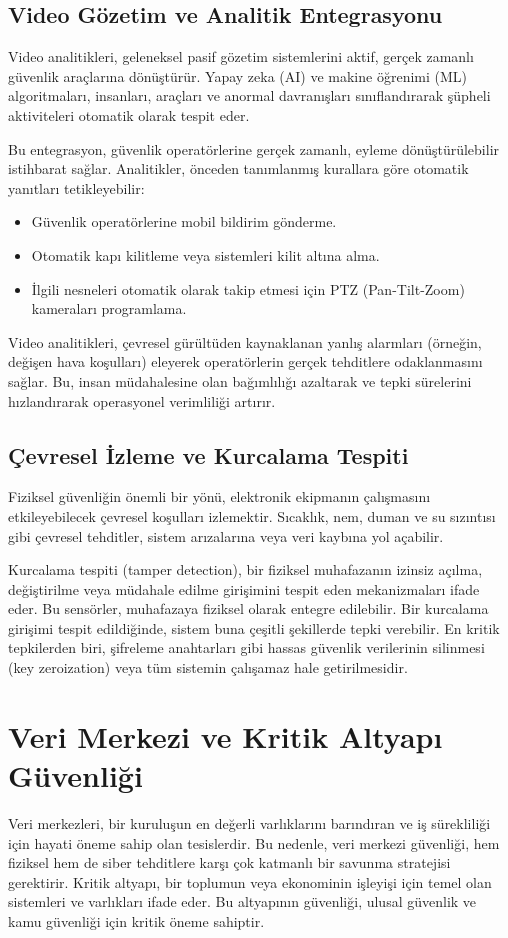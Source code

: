\subsection{Video Gözetim ve Analitik Entegrasyonu}

Video analitikleri, geleneksel pasif gözetim sistemlerini aktif, gerçek zamanlı güvenlik araçlarına dönüştürür. Yapay zeka (AI) ve makine öğrenimi (ML) algoritmaları, insanları, araçları ve anormal davranışları sınıflandırarak şüpheli aktiviteleri otomatik olarak tespit eder.

Bu entegrasyon, güvenlik operatörlerine gerçek zamanlı, eyleme dönüştürülebilir istihbarat sağlar. Analitikler, önceden tanımlanmış kurallara göre otomatik yanıtları tetikleyebilir:
\begin{itemize}
    \item Güvenlik operatörlerine mobil bildirim gönderme.
    \item Otomatik kapı kilitleme veya sistemleri kilit altına alma.
    \item İlgili nesneleri otomatik olarak takip etmesi için PTZ (Pan-Tilt-Zoom) kameraları programlama.
\end{itemize}
Video analitikleri, çevresel gürültüden kaynaklanan yanlış alarmları (örneğin, değişen hava koşulları) eleyerek operatörlerin gerçek tehditlere odaklanmasını sağlar. Bu, insan müdahalesine olan bağımlılığı azaltarak ve tepki sürelerini hızlandırarak operasyonel verimliliği artırır.

\subsection{Çevresel İzleme ve Kurcalama Tespiti}

Fiziksel güvenliğin önemli bir yönü, elektronik ekipmanın çalışmasını etkileyebilecek çevresel koşulları izlemektir. Sıcaklık, nem, duman ve su sızıntısı gibi çevresel tehditler, sistem arızalarına veya veri kaybına yol açabilir.

Kurcalama tespiti (tamper detection), bir fiziksel muhafazanın izinsiz açılma, değiştirilme veya müdahale edilme girişimini tespit eden mekanizmaları ifade eder. Bu sensörler, muhafazaya fiziksel olarak entegre edilebilir. Bir kurcalama girişimi tespit edildiğinde, sistem buna çeşitli şekillerde tepki verebilir. En kritik tepkilerden biri, şifreleme anahtarları gibi hassas güvenlik verilerinin silinmesi (key zeroization) veya tüm sistemin çalışamaz hale getirilmesidir.

\section{Veri Merkezi ve Kritik Altyapı Güvenliği}
Veri merkezleri, bir kuruluşun en değerli varlıklarını barındıran ve iş sürekliliği için hayati öneme sahip olan tesislerdir. Bu nedenle, veri merkezi güvenliği, hem fiziksel hem de siber tehditlere karşı çok katmanlı bir savunma stratejisi gerektirir. Kritik altyapı, bir toplumun veya ekonominin işleyişi için temel olan sistemleri ve varlıkları ifade eder. Bu altyapının güvenliği, ulusal güvenlik ve kamu güvenliği için kritik öneme sahiptir.

